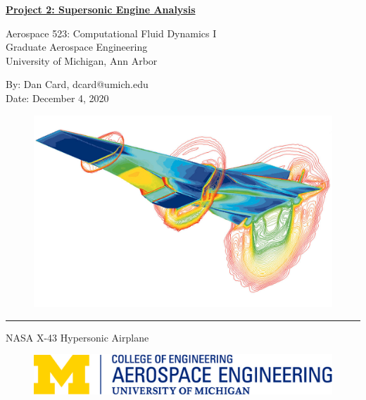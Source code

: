 \thispagestyle{empty}
\begin{center}
    \textbf{{\LARGE{\underline{Project 2: Supersonic Engine Analysis}}}}

    \vspace{0.25cm}
    Aerospace 523: Computational Fluid Dynamics I
    \\ Graduate Aerospace Engineering
    \\ University of Michigan, Ann Arbor
    
    \vspace{0.25cm}
    By: Dan Card, dcard@umich.edu
    \\ Date: December 4, 2020
\end{center}


\begin{figure}[h]
    \centering
    \includegraphics[width = \linewidth]{admin/cover.jpg}
\end{figure}
\begin{flushright}
    {\rule{2.5in}{1pt}}

    NASA X-43 Hypersonic Airplane 
\end{flushright}

\pagebreak
{
    \begin{figure}[h]
        \includegraphics[width=\linewidth]{admin/aero.jpg}
    \end{figure}

    \tableofcontents
    \pagebreak
    \listoffigures
    \listofmyequations
    \listoftables
    \lstlistoflistings
    \thispagestyle{empty}
}